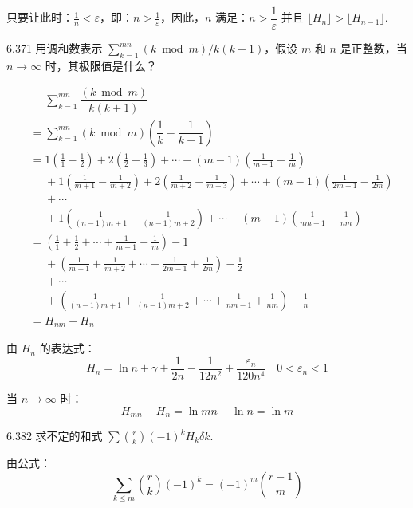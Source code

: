 只要让此时：\( \frac{1}{n} < \varepsilon \)，即：\( n > \frac{1}{\varepsilon} \)，因此，\( n \) 满足：\( n > \dfrac{1}{\varepsilon} \) 并且 \( \lfloor H_n \rfloor > \lfloor H_{n-1} \rfloor \).

\begin{problem}{6.37}{1}
  用调和数表示 \( \sum_{k=1}^{mn} (k \bmod m) / k (k+1) \)，假设 \( m \) 和 \( n \) 是正整数，当 \( n \to \infty \) 时，其极限值是什么？
\end{problem}

\begin{align*}
  &\phantom{=} \sum_{k=1}^{mn} \dfrac{(k \bmod m)}{k (k+1)} \\
  &= \sum_{k=1}^{mn} (k \bmod m) \left( \dfrac{1}{k} - \dfrac{1}{k+1} \right) \\
  &= 1 (\frac{1}{1} - \frac{1}{2}) + 2 (\frac{1}{2} - \frac{1}{3}) + \cdots + (m-1) (\frac{1}{m-1} - \frac{1}{m}) \\
  & \phantom{=} + 1 (\frac{1}{m+1} - \frac{1}{m+2}) + 2 (\frac{1}{m+2} - \frac{1}{m+3}) + \cdots + (m-1) (\frac{1}{2m-1} - \frac{1}{2m}) \\
  & \phantom{=} + \cdots \\
  & \phantom{=} + 1 (\frac{1}{(n-1)m + 1} - \frac{1}{(n-1)m + 2}) + \cdots + (m-1) (\frac{1}{nm-1} - \frac{1}{nm}) \\[5pt]
  &= \left( \frac{1}{1} + \frac{1}{2} + \cdots + \frac{1}{m-1} + \frac{1}{m} \right) - 1 \\
  & \phantom{=} + \left( \frac{1}{m+1} + \frac{1}{m+2} + \cdots + \frac{1}{2m-1} + \frac{1}{2m} \right) - \frac{1}{2} \\
  & \phantom{=} + \cdots \\
  & \phantom{=} + \left( \frac{1}{(n-1)m + 1} + \frac{1}{(n-1)m + 2} + \cdots + \frac{1}{nm-1} + \frac{1}{nm} \right) - \frac{1}{n} \\[5pt]
  &= H_{nm} - H_n
\end{align*}

由 \( H_n \) 的表达式：
\[
  \boxed{H_n = \ln{n} + \gamma + \frac{1}{2n} - \frac{1}{12 n^2} + \frac{\varepsilon_n}{120 n^4} \quad 0 < \varepsilon_n < 1}
\]

当 \( n \to \infty \) 时：
\[
  H_{mn} - H_n = \ln{mn} - \ln{n} = \ln{m}
\]

\begin{problem}{6.38}{2}
  求不定的和式 \( \displaystyle\sum \binom{r}{k} (-1)^k H_k \delta k \).
\end{problem}

由公式：
\[
  \boxed{\sum_{k \leqslant m} \binom{r}{k} (-1)^k = (-1)^m \binom{r-1}{m}}
\]

